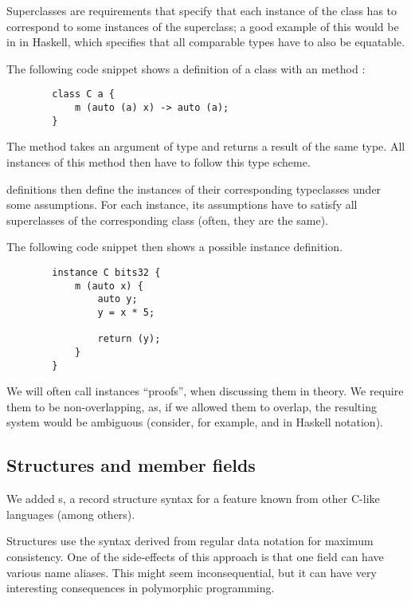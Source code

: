Superclasses are requirements that specify that each instance of the class has to correspond to some instances of the superclass; a good example of this would be  in  in Haskell, which specifies that all comparable types have to also be equatable.

\begin{ex}[Classes]
    The following code snippet shows a definition of a class  with an method :

    \begin{lstlisting}
        class C a {
            m (auto (a) x) -> auto (a);
        }
    \end{lstlisting}

    The method  takes an argument of type  and returns a result of the same type. All instances of this method then have to follow this type scheme.
\end{ex}

 definitions then define the instances of their corresponding typeclasses under some assumptions. For each instance, its assumptions have to satisfy all superclasses of the corresponding class (often, they are the same).

\begin{ex}[Instance]
    The following code snippet then shows a possible instance definition.

    \begin{lstlisting}
        instance C bits32 {
            m (auto x) {
                auto y;
                y = x * 5;

                return (y);
            }
        }
    \end{lstlisting}
\end{ex}

We will often call instances ``proofs'', when discussing them in theory. We require them to be non-overlapping, as, if we allowed them to overlap, the resulting system would be ambiguous (consider, for example,  and  in Haskell notation).

\subsection{Structures and member fields}
\label{sec:structExt}

We added s, a record structure syntax for a feature known from other C-like languages (among others).

Structures use the syntax derived from regular data notation for maximum consistency. One of the side-effects of this approach is that one field can have various name aliases. This might seem inconsequential, but it can have very interesting consequences in polymorphic programming.


